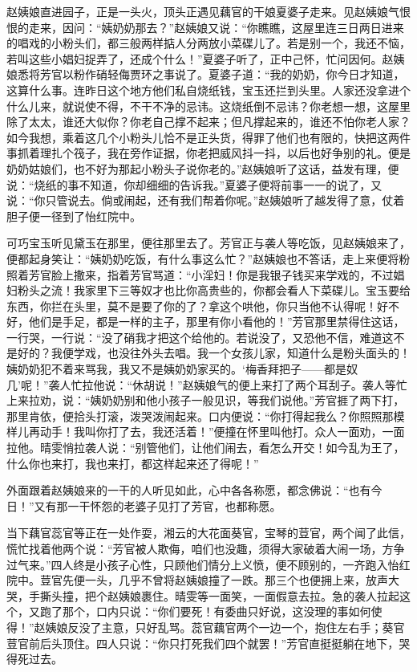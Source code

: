 赵姨娘直进园子，正是一头火，顶头正遇见藕官的干娘夏婆子走来。见赵姨娘气恨恨的走来，因问：“姨奶奶那去？”赵姨娘又说：“你瞧瞧，这屋里连三日两日进来的唱戏的小粉头们，都三般两样掂人分两放小菜碟儿了。若是别一个，我还不恼，若叫这些小娼妇捉弄了，还成个什么！”夏婆子听了，正中己怀，忙问因何。赵姨娘悉将芳官以粉作硝轻侮贾环之事说了。夏婆子道：“我的奶奶，你今日才知道，这算什么事。连昨日这个地方他们私自烧纸钱，宝玉还拦到头里。人家还没拿进个什么儿来，就说使不得，不干不净的忌讳。这烧纸倒不忌讳？你老想一想，这屋里除了太太，谁还大似你？你老自己撑不起来；但凡撑起来的，谁还不怕你老人家？如今我想，乘着这几个小粉头儿恰不是正头货，得罪了他们也有限的，快把这两件事抓着理扎个筏子，我在旁作证据，你老把威风抖一抖，以后也好争别的礼。便是奶奶姑娘们，也不好为那起小粉头子说你老的。”赵姨娘听了这话，益发有理，便说：“烧纸的事不知道，你却细细的告诉我。”夏婆子便将前事一一的说了，又说：“你只管说去。倘或闹起，还有我们帮着你呢。”赵姨娘听了越发得了意，仗着胆子便一径到了怡红院中。

可巧宝玉听见黛玉在那里，便往那里去了。芳官正与袭人等吃饭，见赵姨娘来了，便都起身笑让：“姨奶奶吃饭，有什么事这么忙？”赵姨娘也不答话，走上来便将粉照着芳官脸上撒来，指着芳官骂道：“小淫妇！你是我银子钱买来学戏的，不过娼妇粉头之流！我家里下三等奴才也比你高贵些的，你都会看人下菜碟儿。宝玉要给东西，你拦在头里，莫不是要了你的了？拿这个哄他，你只当他不认得呢！好不好，他们是手足，都是一样的主子，那里有你小看他的！”芳官那里禁得住这话，一行哭，一行说：“没了硝我才把这个给他的。若说没了，又恐他不信，难道这不是好的？我便学戏，也没往外头去唱。我一个女孩儿家，知道什么是粉头面头的！姨奶奶犯不着来骂我，我又不是姨奶奶家买的。‘梅香拜把子------都是奴几’呢！”袭人忙拉他说：“休胡说！”赵姨娘气的便上来打了两个耳刮子。袭人等忙上来拉劝，说：“姨奶奶别和他小孩子一般见识，等我们说他。”芳官捱了两下打，那里肯依，便拾头打滚，泼哭泼闹起来。口内便说：“你打得起我么？你照照那模样儿再动手！我叫你打了去，我还活着！”便撞在怀里叫他打。众人一面劝，一面拉他。晴雯悄拉袭人说：“别管他们，让他们闹去，看怎么开交！如今乱为王了，什么你也来打，我也来打，都这样起来还了得呢！”

外面跟着赵姨娘来的一干的人听见如此，心中各各称愿，都念佛说：“也有今日！”又有那一干怀怨的老婆子见打了芳官，也都称愿。

当下藕官蕊官等正在一处作耍，湘云的大花面葵官，宝琴的荳官，两个闻了此信，慌忙找着他两个说：“芳官被人欺侮，咱们也没趣，须得大家破着大闹一场，方争过气来。”四人终是小孩子心性，只顾他们情分上义愤，便不顾别的，一齐跑入怡红院中。荳官先便一头，几乎不曾将赵姨娘撞了一跌。那三个也便拥上来，放声大哭，手撕头撞，把个赵姨娘裹住。晴雯等一面笑，一面假意去拉。急的袭人拉起这个，又跑了那个，口内只说：“你们要死！有委曲只好说，这没理的事如何使得！”赵姨娘反没了主意，只好乱骂。蕊官藕官两个一边一个，抱住左右手；葵官荳官前后头顶住。四人只说：“你只打死我们四个就罢！”芳官直挺挺躺在地下，哭得死过去。

